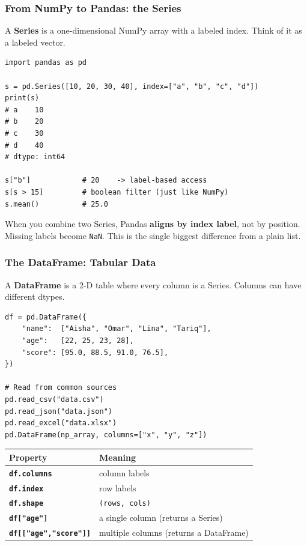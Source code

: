 \documentclass[aspectratio=169,10pt]{beamer}
\newcommand{\keyword}[1]{\textcolor{PrimaryBlue}{\textbf{#1}}}
\newcommand{\codeword}[1]{\texttt{#1}}
\newcommand{\code}[1]{\texttt{#1}}
\begin{document}
\begin{frame}[fragile]
\frametitle{From NumPy to Pandas: the Series}
\small
A \keyword{Series} is a one-dimensional NumPy array with a labeled index. Think of it as a labeled vector.

\vspace{0.12cm}
\begin{lstlisting}[style=pycode]
import pandas as pd

s = pd.Series([10, 20, 30, 40], index=["a", "b", "c", "d"])
print(s)
# a    10
# b    20
# c    30
# d    40
# dtype: int64

s["b"]            # 20    -> label-based access
s[s > 15]         # boolean filter (just like NumPy)
s.mean()          # 25.0
\end{lstlisting}

\begin{tcolorbox}[lecturebox,title=Index alignment]
When you combine two Series, Pandas \keyword{aligns by index label}, not by position. Missing labels become \codeword{NaN}. This is the single biggest difference from a plain list.
\end{tcolorbox}
\end{frame}


\begin{frame}[fragile]
\frametitle{The DataFrame: Tabular Data}
\small
A \keyword{DataFrame} is a 2-D table where every column is a Series. Columns can have different dtypes.

\vspace{0.12cm}
\begin{lstlisting}[style=pycode]
df = pd.DataFrame({
    "name":  ["Aisha", "Omar", "Lina", "Tariq"],
    "age":   [22, 25, 23, 28],
    "score": [95.0, 88.5, 91.0, 76.5],
})

# Read from common sources
pd.read_csv("data.csv")
pd.read_json("data.json")
pd.read_excel("data.xlsx")
pd.DataFrame(np_array, columns=["x", "y", "z"])
\end{lstlisting}

\renewcommand{\arraystretch}{1.20}
\begin{tabularx}{\linewidth}{>{\bfseries}p{3.6cm}X}
\toprule
Property & Meaning \\
\midrule
\code{df.columns}  & column labels \\
\code{df.index}    & row labels \\
\code{df.shape}    & \texttt{(rows, cols)} \\
\code{df["age"]}   & a single column (returns a Series) \\
\code{df[["age","score"]]} & multiple columns (returns a DataFrame) \\
\bottomrule
\end{tabularx}
\end{frame}
\end{document}
